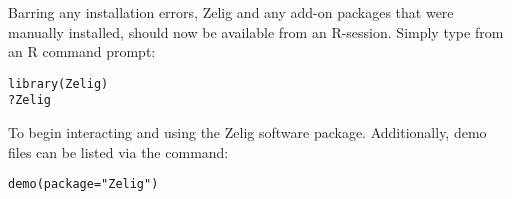 Barring any installation errors, Zelig and any add-on packages that were manually installed, should now be available from an R-session. Simply type from an R command prompt:

\begin{verbatim}
library(Zelig)
?Zelig
\end{verbatim}

To begin interacting and using the Zelig software package. Additionally, demo files can be listed via the command:

\begin{verbatim}
demo(package="Zelig")
\end{verbatim}
